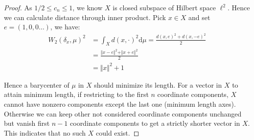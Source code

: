 \documentclass{report}
\theoremstyle{remark}
\theoremstyle{definition}
\newcommand{\diff}{\mathrm{d}}
\begin{document}
\begin{proof}
	As $ 1 / 2 \leq c_{n} \leq 1$, we know $X$ is closed subspace of Hilbert space $\ell^2$. Hence we can calculate distance through inner product. Pick $ x \in X$ and set $ e=(1,0,0\ldots)$, we have:
	\begin{align*}
		W_2(\delta_x, \mu)^2 & = \int_{X} d(x, \cdot)^2 \diff \mu = \frac{d(x,e)^2+d(x,-e)^2 }{2} \\
		                     & =\frac{\Vert x - e \Vert^2 + \Vert x + e \Vert^2}{2}               \\
		                     & =\Vert x \Vert^2 + 1
	\end{align*}

	Hence a barycenter of $\mu$ in $X$ should minimize its length. For a vector in $X$ to attain minimum length, if restricting to the first $n$ coordinate components, $X$ cannot have nonzero components except the last one (minimum length axes). Otherwise we can keep other not considered coordinate components unchanged but vanish first $n-1$ coordinate components to get a strictly shorter vector in $X$. This indicates that no such $X$ could exist.
\end{proof}
\end{document}
